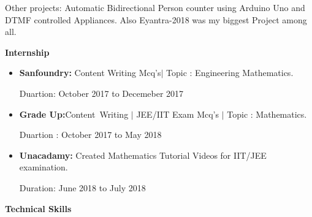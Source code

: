\documentclass[12pt]{article}
\begin{document}
\begin{enumerate}[label*={\fontsize{13pt}{13pt}\selectfont \textbf{\textbf{\arabic*.}}}]
\vspace{0.1cm}
{\fontsize{13pt}{15.6pt}\selectfont Other projects: Automatic Bidirectional Person counter using Arduino Uno and DTMF controlled Appliances. Also Eyantra-2018 was my biggest Project among all.\par}\end{enumerate}\par


\vspace{\baselineskip}


{\fontsize{14pt}{16.8pt}\selectfont \textbf{Internship}\par}\par
\begin{itemize}
\item{\fontsize{13pt}{15.6pt}\selectfont \textbf{Sanfoundry: }Content Writing Mcq’s$ \vert $  Topic : Engineering Mathematics.\par}\par

{\fontsize{13pt}{15.6pt}\selectfont Duartion: October 2017 to Decemeber 2017\par}\par

\item{\fontsize{13pt}{15.6pt}\selectfont \textbf{Grade Up:}Content\ Writing  $ \vert $  JEE/IIT Exam Mcq’s $ \vert $  Topic : Mathematics.\par}\par

{\fontsize{13pt}{15.6pt}\selectfont Duartion : October 2017 to May 2018\par}\par

\item{\fontsize{13pt}{15.6pt}\selectfont \textbf{Unacadamy: }Created Mathematics Tutorial Videos for IIT/JEE examination.\par}\par

{\fontsize{13pt}{15.6pt}\selectfont Duration: June 2018 to July 2018\par}\par
\end{itemize}


\vspace{4cm}
{\fontsize{14pt}{16.8pt}\selectfont \textbf{Technical Skills}\par}\par
\end{document}
